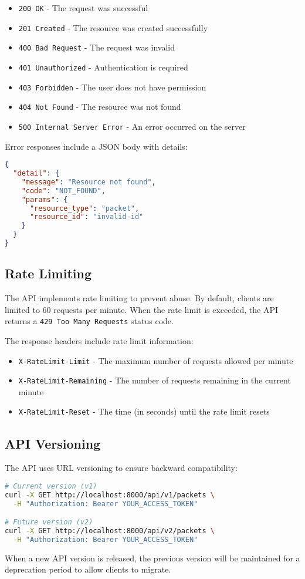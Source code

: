 \begin{itemize}
    \item \texttt{200 OK} - The request was successful
    \item \texttt{201 Created} - The resource was created successfully
    \item \texttt{400 Bad Request} - The request was invalid
    \item \texttt{401 Unauthorized} - Authentication is required
    \item \texttt{403 Forbidden} - The user does not have permission
    \item \texttt{404 Not Found} - The resource was not found
    \item \texttt{500 Internal Server Error} - An error occurred on the server
\end{itemize}

Error responses include a JSON body with details:

\begin{lstlisting}[language=json, caption=Error Response Example]
{
  "detail": {
    "message": "Resource not found",
    "code": "NOT_FOUND",
    "params": {
      "resource_type": "packet",
      "resource_id": "invalid-id"
    }
  }
}
\end{lstlisting}

\subsection{Rate Limiting}
The API implements rate limiting to prevent abuse. By default, clients are limited to 60 requests per minute. When the rate limit is exceeded, the API returns a \texttt{429 Too Many Requests} status code.

The response headers include rate limit information:

\begin{itemize}
    \item \texttt{X-RateLimit-Limit} - The maximum number of requests allowed per minute
    \item \texttt{X-RateLimit-Remaining} - The number of requests remaining in the current minute
    \item \texttt{X-RateLimit-Reset} - The time (in seconds) until the rate limit resets
\end{itemize}

\subsection{API Versioning}
The API uses URL versioning to ensure backward compatibility:

\begin{lstlisting}[language=bash, caption=API Versioning Example]
# Current version (v1)
curl -X GET http://localhost:8000/api/v1/packets \
  -H "Authorization: Bearer YOUR_ACCESS_TOKEN"

# Future version (v2)
curl -X GET http://localhost:8000/api/v2/packets \
  -H "Authorization: Bearer YOUR_ACCESS_TOKEN"
\end{lstlisting}

When a new API version is released, the previous version will be maintained for a deprecation period to allow clients to migrate.